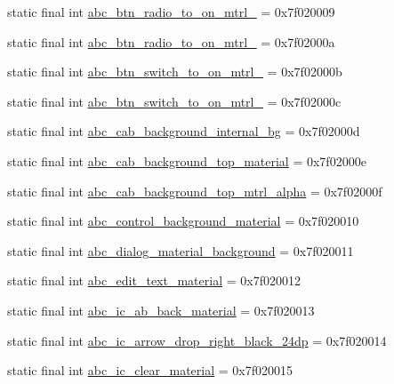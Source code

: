 \begin{CompactItemize}
static final int \hyperlink{classandroid_1_1support_1_1v4_1_1_r_1_1drawable_294dab4befe5ed7374ae05258ed4e1eb}{abc\_\-btn\_\-radio\_\-to\_\-on\_\-mtrl\_} = 0x7f020009
\item 
static final int \hyperlink{classandroid_1_1support_1_1v4_1_1_r_1_1drawable_2a9ec39bc12c063b55d4d6f6742296b9}{abc\_\-btn\_\-radio\_\-to\_\-on\_\-mtrl\_} = 0x7f02000a
\item 
static final int \hyperlink{classandroid_1_1support_1_1v4_1_1_r_1_1drawable_1c80ee41d99dfc9c9af5913c89115964}{abc\_\-btn\_\-switch\_\-to\_\-on\_\-mtrl\_} = 0x7f02000b
\item 
static final int \hyperlink{classandroid_1_1support_1_1v4_1_1_r_1_1drawable_863f6d9af42755edab0ef06cca46ec89}{abc\_\-btn\_\-switch\_\-to\_\-on\_\-mtrl\_} = 0x7f02000c
\item 
static final int \hyperlink{classandroid_1_1support_1_1v4_1_1_r_1_1drawable_e349f3e7797ed4319e788a274b2005d8}{abc\_\-cab\_\-background\_\-internal\_\-bg} = 0x7f02000d
\item 
static final int \hyperlink{classandroid_1_1support_1_1v4_1_1_r_1_1drawable_ba591bd775457bbc8a6d55d65ddf800d}{abc\_\-cab\_\-background\_\-top\_\-material} = 0x7f02000e
\item 
static final int \hyperlink{classandroid_1_1support_1_1v4_1_1_r_1_1drawable_f3c378c527a944f7730db8382995ebcc}{abc\_\-cab\_\-background\_\-top\_\-mtrl\_\-alpha} = 0x7f02000f
\item 
static final int \hyperlink{classandroid_1_1support_1_1v4_1_1_r_1_1drawable_41befa97dec169b22b5b41a1f24d06a0}{abc\_\-control\_\-background\_\-material} = 0x7f020010
\item 
static final int \hyperlink{classandroid_1_1support_1_1v4_1_1_r_1_1drawable_137f7fefa11edf71727e7109c05d3f76}{abc\_\-dialog\_\-material\_\-background} = 0x7f020011
\item 
static final int \hyperlink{classandroid_1_1support_1_1v4_1_1_r_1_1drawable_fa94bc4be7dfa6e33f1649a2ecddbdf4}{abc\_\-edit\_\-text\_\-material} = 0x7f020012
\item 
static final int \hyperlink{classandroid_1_1support_1_1v4_1_1_r_1_1drawable_2eea8dfaeefee811afdeb397e159928b}{abc\_\-ic\_\-ab\_\-back\_\-material} = 0x7f020013
\item 
static final int \hyperlink{classandroid_1_1support_1_1v4_1_1_r_1_1drawable_f0c26e32109211c5fbf836bf822c43f8}{abc\_\-ic\_\-arrow\_\-drop\_\-right\_\-black\_\-24dp} = 0x7f020014
\item 
static final int \hyperlink{classandroid_1_1support_1_1v4_1_1_r_1_1drawable_a9e3c33d7d8d2f435972b53cb8ac4a02}{abc\_\-ic\_\-clear\_\-material} = 0x7f020015

\end{CompactItemize}
